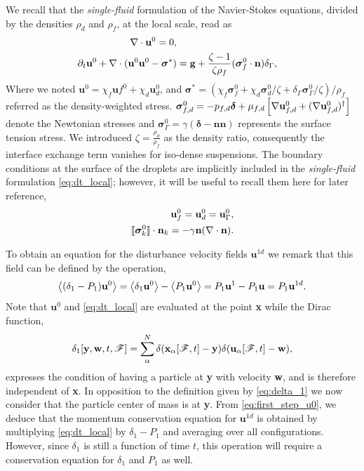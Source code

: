 We recall that the \textit{single-fluid} formulation of the Navier-Stokes equations, divided by the densities $\rho_d$ and $\rho_f$, at the local scale, read as
\begin{align}
    \label{eq:dt_local_mass}
    \div \textbf{u}^0 = 0, \\
    \pddt \textbf{u}^0
    + \div (\textbf{u}^0\textbf{u}^0 - \bm\sigma^*)
    &= \textbf{g}
    +\frac{\zeta-1}{\zeta\rho_f}(\bm\sigma_f^0\cdot \textbf{n})\delta_\Gamma,
    \label{eq:dt_local}
\end{align}
Where we noted $\textbf{u}^0 = \chi_f \textbf{u}f^0 + \chi_d \textbf{u}_d^0$, and $\bm\sigma^* = (\chi_f \bm\sigma_f^0 + \chi_d \bm\sigma_d^0/\zeta + \delta_\Gamma \bm\sigma_\Gamma^0/\zeta )/\rho_f $ referred as the density-weighted stress.
$\bm\sigma_{f,d}^0 = -p_{f,d}\bm\delta + \mu_{f,d}\left[\mathbf{\nabla} \textbf{u}_{f,d}^0+ (\mathbf{\nabla} \textbf{u}_{f,d}^0)^\dagger\right]$ denote the Newtonian stresses and $\bm\sigma_\Gamma^0 = \gamma (\bm\delta - \textbf{nn})$ represents the surface tension stress. 
We introduced $\zeta = \frac{\rho_d}{\rho_f}$ as the density ratio, consequently the interface exchange term vanishes for iso-dense suspensions. 
The boundary conditions at the surface of the droplets are implicitly included in the \textit{single-fluid} formulation \eqref{eq:dt_local}; however, it will be useful to recall them here for later reference, 
\begin{align}
    \label{eq:dt_rho_I3}
    \textbf{u}_f^0 = \textbf{u}_d^0 = \textbf{u}_\Gamma^0, \\
    \Jump{\bm{\sigma}_k^0} 
    =
    -\gamma\textbf{n}(\div \textbf{n}). 
    \label{eq:dt_rho_I2}
\end{align}

To obtain an equation for the disturbance velocity fields $\textbf{u}^{1d}$ we remark that this field can be defined by the operation, 
\begin{equation}
    \avg{(\delta_1 - P_1) \textbf{u}^0}
    =
    \avg{\delta_1 \textbf{u}^0}
    - \avg{P_1 \textbf{u}^0}
    = 
    P_1 \textbf{u}^1
    - P_1 \textbf{u}
    = P_1 \textbf{u}^{1d}. 
    \label{eq:first_step_u0}
\end{equation}
Note that $\textbf{u}^0$ and \ref{eq:dt_local} are evaluated at the point \textbf{x} while the Dirac function, 
\begin{equation}
    \delta_1[\textbf{y},\textbf{w},t,\mathscr{F}] = \sum_\alpha^N \delta(\textbf{x}_\alpha[\mathscr{F},t]-\textbf{y})\delta(\textbf{u}_\alpha[\mathscr{F},t] - \textbf{w}),
\end{equation}
expresses the condition of having a particle at \textbf{y} with velocity \textbf{w}, and is therefore independent of \textbf{x}. 
In opposition to the definition given by \ref{eq:delta_1} we now consider that the particle center of mass is at \textbf{y}. 
From \ref{eq:first_step_u0}, we deduce that the momentum conservation equation for $\textbf{u}^{1d}$ is obtained by multiplying \ref{eq:dt_local} by $\delta_1 - P_1$ and averaging over all configurations. 
However, since $\delta_1$ is still a function of time $t$, this operation will require a conservation equation for $\delta_1$ and $P_1$ as well.  

